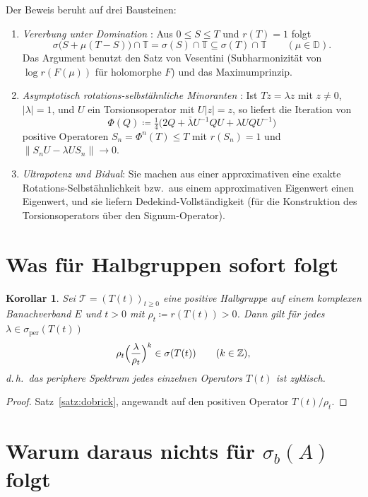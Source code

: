 \documentclass[11pt,a4paper]{article}
\newtheorem{korollar}[satz]{Korollar}
\theoremstyle{remark}
\theoremstyle{definition}
\newcommand{\Z}{\mathbb{Z}}
\newcommand{\T}{\mathbb{T}}
\newcommand{\D}{\mathbb{D}}
\newcommand{\TT}{\mathcal{T}}
\newcommand{\sperb}{\sigma_{\mathrm{per}}}
\begin{document}
Der Beweis beruht auf drei Bausteinen:
\begin{enumerate}[label=(\Alph*)]
\item \emph{Vererbung unter Domination} \cite[Theorem~2.3]{dobrick}: Aus $0 \le S \le T$ und $r(T) = 1$ folgt
\[
  \sigma\bigl(S + \mu(T-S)\bigr) \cap \T = \sigma(S) \cap \T \subseteq \sigma(T) \cap \T \qquad (\mu \in \D).
\]
Das Argument benutzt den Satz von Vesentini (Subharmonizität von $\log r(F(\mu))$ für holomorphe $F$) und das Maximumprinzip.

\item \emph{Asymptotisch rotations-selbstähnliche Minoranten} \cite[Proposition~3.4]{dobrick}: Ist $Tz = \lambda z$ mit $z \neq 0$, $|\lambda| = 1$, und $U$ ein Torsionsoperator mit $U|z| = z$, so liefert die Iteration von
\[
  \Phi(Q) \coloneqq \tfrac{1}{4}\bigl(2Q + \bar\lambda U^{-1}QU + \lambda UQU^{-1}\bigr)
\]
positive Operatoren $S_n = \Phi^n(T) \le T$ mit $r(S_n) = 1$ und $\|S_nU - \lambda US_n\| \to 0$.

\item \emph{Ultrapotenz und Bidual}: Sie machen aus einer approximativen eine exakte Rotations-Selbstähnlichkeit bzw.\ aus einem approximativen Eigenwert einen Eigenwert, und sie liefern Dedekind-Vollständigkeit (für die Konstruktion des Torsionsoperators über den Signum-Operator).
\end{enumerate}

\section{Was für Halbgruppen sofort folgt}

\begin{korollar}\label{kor:T(t)}
Sei $\TT = (T(t))_{t \ge 0}$ eine positive Halbgruppe auf einem komplexen Banachverband $E$ und $t > 0$ mit $\rho_t \coloneqq r(T(t)) > 0$.
Dann gilt für jedes $\lambda \in \sperb(T(t))$
\[
  \rho_t \Bigl(\frac{\lambda}{\rho_t}\Bigr)^{k} \in \sigma(T(t)) \qquad (k \in \Z),
\]
d.\,h.\ das periphere Spektrum jedes einzelnen Operators $T(t)$ ist zyklisch.
\end{korollar}

\begin{proof}
Satz~\ref{satz:dobrick}, angewandt auf den positiven Operator $T(t)/\rho_t$.
\end{proof}

\section{Warum daraus nichts für \texorpdfstring{$\sigma_b(A)$}{sigma\_b(A)} folgt}
\end{document}
